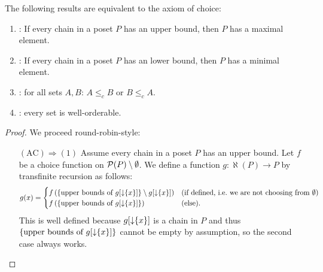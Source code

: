 \begin{theorem}
The following results are equivalent to the axiom of choice:
\begin{enumerate}
\item {}: If every chain in a poset $P$ has an upper bound, then $P$ has a maximal element.
\item {}: If every chain in a poset $P$ has an lower bound, then $P$ has a minimal element.
\item {}: for all sets $A,B$: $A\leq_c B$ or $B\leq_c A$.
\item {}: every set is well-orderable.
\end{enumerate}
\end{theorem}
\begin{proof}
We proceed round-robin-style:
\begin{itemize}[leftmargin=2cm]
\item[$\boxed{(\text{AC}) \Rightarrow (1)}$] Assume every chain in a poset $P$ has an upper bound. Let $f$ be a choice function on $\operatorname{\mathcal{P}}(P)\setminus \emptyset$. We define a function $g: \aleph(P) \to P$ by transfinite recursion as follows:
\[ g(x) = \begin{cases}
f\left( \{\text{upper bounds of $g[\operatorname{\downarrow}\{x\}]$}  \} \setminus g[\operatorname{\downarrow}\{x\}] \right) & \text{(if defined, i.e.\ we are not choosing from $\emptyset$)} \\
f\left( \{\text{upper bounds of $g[\operatorname{\downarrow}\{x\}]$}  \} \right) & (\text{else}).
\end{cases} \]
This is well defined because $g[\operatorname{\downarrow}\{x\}]$ is a chain in $P$ and thus $\{\text{upper bounds of $g[\operatorname{\downarrow}\{x\}]$}  \}$ cannot be empty by assumption, so the second case always works.


\end{itemize}
\end{proof}
